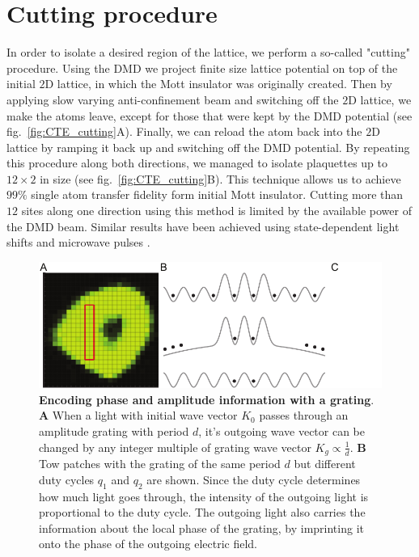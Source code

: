 \section{Cutting procedure}

In order to isolate a desired region of the lattice, we perform a so-called "cutting" procedure. Using the DMD we project finite size lattice potential on top of the initial $2\mathrm{D}$ lattice, in which the Mott insulator was originally created. Then by applying slow varying anti-confinement beam and switching off the $2\mathrm{D}$ lattice, we make the atoms leave, except for those that were kept by the DMD potential (see fig.~\ref{fig:CTE_cutting}A). Finally, we can reload the atom back into the $2\mathrm{D}$ lattice by ramping it back up and switching off the DMD potential. By repeating this procedure along both directions, we managed to isolate plaquettes up to $12\times2$ in size (see fig.~\ref{fig:CTE_cutting}B). This technique allows us to achieve $99\%$ single atom transfer fidelity form initial Mott insulator. Cutting more than $12$ sites along one direction using this method is limited by the available power of the DMD beam. Similar results have been achieved using state-dependent light shifts and microwave pulses \cite{Bloch single site addresing}.

\begin{figure}[t]
	\centering
	\includegraphics[scale=1]{figures/CTE_cutting.pdf}
	\caption{{\bf Encoding phase and amplitude information with a grating}. {\bf A} When a light with initial wave vector $K_0$ passes through an amplitude grating with period $d$, it's outgoing wave vector can be changed by any integer multiple of grating wave vector $K_g\propto \frac{1}{d}$. {\bf B} Tow patches with the grating of the same period $d$ but different duty cycles $q_1$ and $q_2$ are shown. Since the duty cycle determines how much light goes through, the intensity of the outgoing light is proportional to the duty cycle. The outgoing light also carries the information about the local phase of the grating, by imprinting it onto the phase of the outgoing electric field.}
	\label{fig:CTE_MI_box}
\end{figure}

